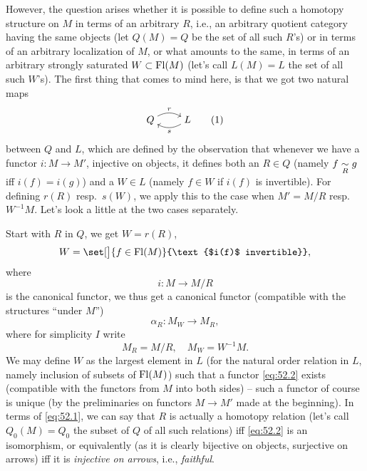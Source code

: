 However, the question arises whether it is possible to define such a
homotopy structure on $M$ in terms of an arbitrary $R$, i.e., an
arbitrary quotient category having the same objects (let $Q(M)=Q$ be
the set of all such $R$'s) or in terms of an arbitrary localization of
$M$, or what amounts to the same, in terms of an arbitrary strongly
saturated $W\subset\operatorname{Fl}(M)$ (let's call $L(M)=L$ the set of all such
$W$'s). The first thing that comes to mind here, is that we got two
natural maps
\begin{equation}
  \label{eq:52.1}
  \begin{tikzcd}[cramped]
    Q \ar[r, bend left, "r"] &
    L \ar[l, bend left, "s"]
  \end{tikzcd}
  \tag{1}
\end{equation}
between $Q$ and $L$, which are defined by the observation that
whenever we have a functor $i:M\to M'$, injective on objects, it
defines both an $R\in Q$ (namely $f\mathrel{\underset{R}{\sim}} g$ if{f} $i(f)=i(g)$) and a
$W\in L$ (namely $f\in W$ if{} $i(f)$ is invertible). For defining
$r(R)$ resp.\ $s(W)$, we apply this to the case when $M'=M/R$ resp.\
$W^{-1}M$. Let's look a little at the two cases separately.

Start with $R$ in $Q$, we get $W=r(R)$,
\[ W = \set[\big]{f\in\Fl(M)}{\text{$i(f)$ invertible}},\]
where
\[ i : M\to M/R\]
is the canonical functor, we thus get a canonical functor (compatible
with the structures ``under $M$'')
\begin{equation}
  \label{eq:52.2}
  \alpha_R : M_W \to M_R,
  \tag{2}
\end{equation}
where for simplicity $I$ write
\[ M_R = M/R,\quad M_W = W^{-1}M.\]
We may define $W$ as the largest element in $L$ (for the natural order
relation in $L$, namely inclusion of subsets of $\operatorname{Fl}(M)$) such that a
functor \eqref{eq:52.2} exists (compatible with the functors from
$M$ into both sides) -- such a functor of course is unique (by the
preliminaries on functors $M\to M'$ made at the beginning). In terms of
\eqref{eq:52.1}, we can say that $R$ is actually a homotopy relation
(let's call $Q_0(M)=Q_0$ the subset of $Q$ of all such relations)
if{f} \eqref{eq:52.2} is an isomorphism, or equivalently (as it is
clearly bijective on objects, surjective on arrows) if{f} it is
\emph{injective on arrows}, i.e., \emph{faithful}.

